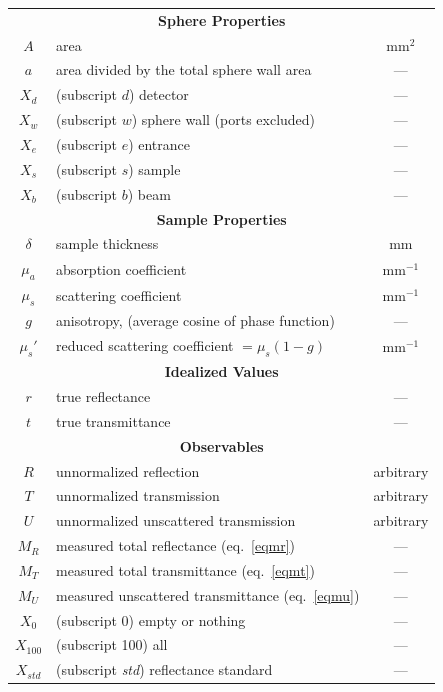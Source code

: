 \documentclass{article}
\begin{document}
\newpage
\tableofcontents 

\newpage

\begin{table}[b]
\centering
\begin{tabular}{cp{7cm}c}
\multicolumn{3}{c}{\textbf{Sphere Properties}}\\
$A$ & area&	mm$^2$\\
$a$ & area divided by the total sphere wall area&	---\\[2mm]
$X_d$ & (subscript $d$) detector&	---\\
$X_w$ & (subscript $w$) sphere wall (ports excluded)&	---\\
$X_e$ & (subscript $e$) entrance &	---\\
$X_s$ & (subscript $s$) sample &	---\\
$X_b$ & (subscript $b$) beam &	---\\[8mm]
%
%
\multicolumn{3}{c}{\textbf{Sample Properties}}\\
$\delta$ & sample thickness & mm\\
$\mu_a$  & absorption coefficient 				&	mm$^{-1}$\\
$\mu_s$  & scattering coefficient 				&	mm$^{-1}$\\
$g$      & anisotropy, (average cosine of phase function) & --- \\
$\mu_s'$ & reduced scattering coefficient $=\mu_s(1-g)$&	mm$^{-1}$\\[8mm]
%
%
\multicolumn{3}{c}{\textbf{Idealized Values}}\\
$r$ & true reflectance & ---\\
$t$ & true transmittance & ---\\[8mm]
%
%
\multicolumn{3}{c}{\textbf{Observables}}\\
$R$ & unnormalized reflection & arbitrary\\
$T$ & unnormalized transmission & arbitrary\\
$U$ & unnormalized unscattered transmission & arbitrary\\[2mm]
$M_R$ & measured total reflectance (eq.~\ref{eqmr})&	---\\
$M_T$ & measured total transmittance (eq.~\ref{eqmt})&	---\\
$M_U$ & measured unscattered transmittance (eq.~\ref{eqmu})&	---\\[2mm]
$X_0$   & (subscript 0) empty or nothing & --- \\
$X_{100}$   & (subscript 100) all & --- \\
$X_\mathit{std}$ & (subscript \textit{std}) reflectance standard & ---\\

\end{tabular}
\end{table}
\end{document}
